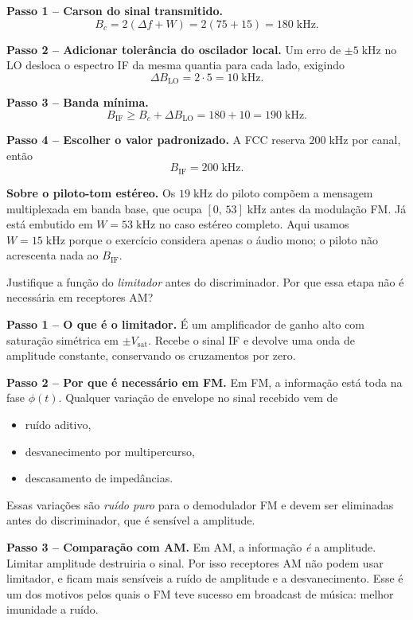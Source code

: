 \documentclass[11pt,a4paper]{article}
\begin{document}
\begin{resolucao}

\textbf{Passo 1 -- Carson do sinal transmitido.}
\[
  B_c = 2(\Delta f + W) = 2(75 + 15) = 180\;\text{kHz}.
\]

\textbf{Passo 2 -- Adicionar tolerância do oscilador local.} Um erro de $\pm 5\;\text{kHz}$ no LO desloca o espectro IF da mesma quantia para cada lado, exigindo
\[
  \Delta B_{\text{LO}} = 2 \cdot 5 = 10\;\text{kHz}.
\]

\textbf{Passo 3 -- Banda mínima.}
\[
  B_{\text{IF}} \ge B_c + \Delta B_{\text{LO}} = 180 + 10 = 190\;\text{kHz}.
\]

\textbf{Passo 4 -- Escolher o valor padronizado.} A FCC reserva $200\;\text{kHz}$ por canal, então
\[
  \boxed{B_{\text{IF}} = 200\;\text{kHz}.}
\]

\textbf{Sobre o piloto-tom estéreo.} Os $19\;\text{kHz}$ do piloto compõem a mensagem multiplexada em banda base, que ocupa $[0,\,53]\;\text{kHz}$ antes da modulação FM. Já está embutido em $W = 53\;\text{kHz}$ no caso estéreo completo. Aqui usamos $W = 15\;\text{kHz}$ porque o exercício considera apenas o áudio mono; o piloto não acrescenta nada ao $B_{\text{IF}}$.
\end{resolucao}

\begin{enunciado}[Item d)]
Justifique a função do \emph{limitador} antes do discriminador. Por que essa etapa não é necessária em receptores AM?
\end{enunciado}

\begin{resolucao}

\textbf{Passo 1 -- O que é o limitador.} É um amplificador de ganho alto com saturação simétrica em $\pm V_{\text{sat}}$. Recebe o sinal IF e devolve uma onda de amplitude constante, conservando os cruzamentos por zero.

\textbf{Passo 2 -- Por que é necessário em FM.} Em FM, a informação está toda na fase $\phi(t)$. Qualquer variação de envelope no sinal recebido vem de
\begin{itemize}\itemsep0pt
  \item ruído aditivo,
  \item desvanecimento por multipercurso,
  \item descasamento de impedâncias.
\end{itemize}
Essas variações são \emph{ruído puro} para o demodulador FM e devem ser eliminadas antes do discriminador, que é sensível a amplitude.

\textbf{Passo 3 -- Comparação com AM.} Em AM, a informação \emph{é} a amplitude. Limitar amplitude destruiria o sinal. Por isso receptores AM não podem usar limitador, e ficam mais sensíveis a ruído de amplitude e a desvanecimento. Esse é um dos motivos pelos quais o FM teve sucesso em broadcast de música: melhor imunidade a ruído.
\end{resolucao}
\end{document}
